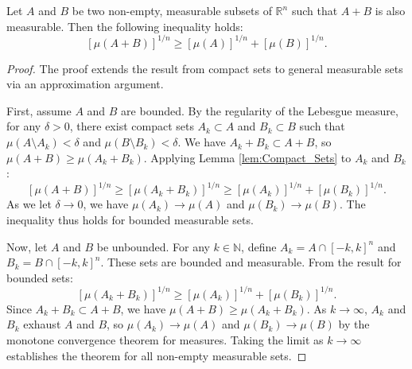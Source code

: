 \begin{theorem}
    \label{thm:Brunn-Minkowski_Theorem}
    Let $A$ and $B$ be two non-empty, measurable subsets of $\mathbb{R}^n$ such that $A+B$ is also measurable. Then the following inequality holds:
    \[ [\mu(A+B)]^{1/n} \geq [\mu(A)]^{1/n} + [\mu(B)]^{1/n}. \]
\end{theorem}

\begin{proof}
    The proof extends the result from compact sets to general measurable sets via an approximation argument.

    First, assume $A$ and $B$ are bounded. By the regularity of the Lebesgue measure, for any $\delta > 0$, there exist compact sets $A_k \subset A$ and $B_k \subset B$ such that $\mu(A \setminus A_k) < \delta$ and $\mu(B \setminus B_k) < \delta$. We have $A_k+B_k \subset A+B$, so $\mu(A+B) \geq \mu(A_k+B_k)$.
    Applying Lemma \ref{lem:Compact_Sets} to $A_k$ and $B_k$:
    \[ [\mu(A+B)]^{1/n} \geq [\mu(A_k+B_k)]^{1/n} \geq [\mu(A_k)]^{1/n} + [\mu(B_k)]^{1/n}. \]
    As we let $\delta \to 0$, we have $\mu(A_k) \to \mu(A)$ and $\mu(B_k) \to \mu(B)$. The inequality thus holds for bounded measurable sets.

    Now, let $A$ and $B$ be unbounded. For any $k \in \mathbb{N}$, define $A_k = A \cap [-k,k]^n$ and $B_k = B \cap [-k,k]^n$. These sets are bounded and measurable. From the result for bounded sets:
    \[ [\mu(A_k+B_k)]^{1/n} \geq [\mu(A_k)]^{1/n} + [\mu(B_k)]^{1/n}. \]
    Since $A_k+B_k \subset A+B$, we have $\mu(A+B) \geq \mu(A_k+B_k)$. As $k \to \infty$, $A_k$ and $B_k$ exhaust $A$ and $B$, so $\mu(A_k) \to \mu(A)$ and $\mu(B_k) \to \mu(B)$ by the monotone convergence theorem for measures. Taking the limit as $k \to \infty$ establishes the theorem for all non-empty measurable sets.
\end{proof}
